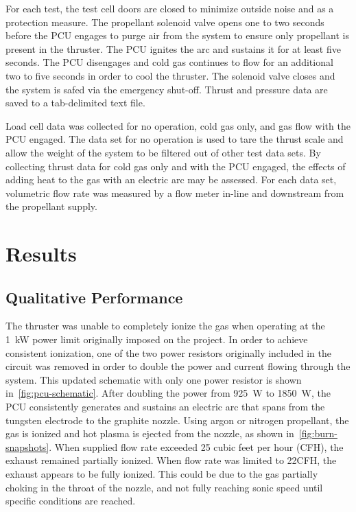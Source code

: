 \documentclass[conference]{IEEEtran}
\begin{document}
For each test, the test cell doors are closed to minimize outside noise and as a protection measure.
The propellant solenoid valve opens one to two seconds before the PCU engages to purge air from the system to ensure only propellant is present in the thruster.
The PCU ignites the arc and sustains it for at least five seconds.
The PCU disengages and cold gas continues to flow for an additional two to five seconds in order to cool the thruster.
The solenoid valve closes and the system is safed via the emergency shut-off.
Thrust and pressure data are saved to a tab-delimited text file.

Load cell data was collected for no operation, cold gas only, and gas flow with the PCU engaged.
The data set for no operation is used to tare the thrust scale and allow the weight of the system to be filtered out of other test data sets.
By collecting thrust data for cold gas only and with the PCU engaged, the effects of adding heat to the gas with an electric arc may be assessed.
For each data set, volumetric flow rate was measured by a flow meter in-line and downstream from the propellant supply.

\section{Results}
\subsection{Qualitative Performance}
The thruster was unable to completely ionize the gas when operating at the \SI{1}{\kilo\watt} power limit originally imposed on the project. In order to achieve consistent ionization, one of the two power resistors originally included in the circuit was removed in order to double the power and current flowing through the system. This updated schematic with only one power resistor is shown in~\autoref{fig:pcu-schematic}. After doubling the power from \SI{925}{\watt} to \SI{1850}{\watt}, the PCU consistently generates and sustains an electric arc that spans from the tungsten electrode to the graphite nozzle.
Using argon or nitrogen propellant, the gas is ionized and hot plasma is ejected from the nozzle, as shown in~\autoref{fig:burn-snapshots}.
When supplied flow rate exceeded 25 cubic feet per hour (CFH), the exhaust remained partially ionized.
When flow rate was limited to 22\si{CFH}, the exhaust appears to be fully ionized.
This could be due to the gas partially choking in the throat of the nozzle, and not fully reaching sonic speed until specific conditions are reached.
\end{document}

